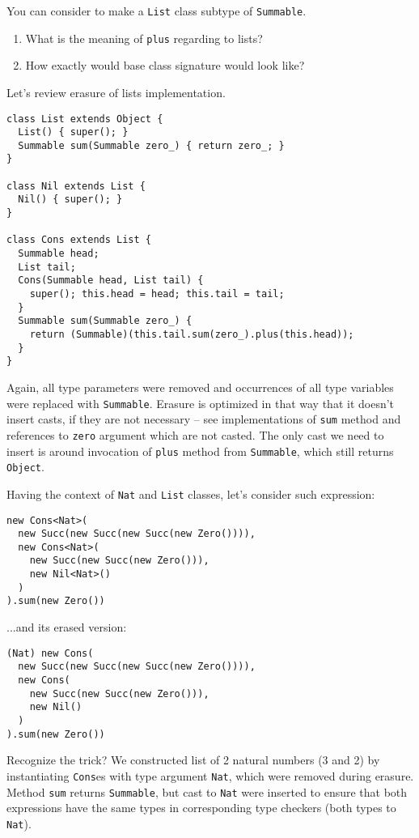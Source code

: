 \documentclass{article}[12pt]
\begin{document}
You can consider to make a \texttt{List} class subtype of
\texttt{Summable}.
\begin{enumerate}
\item What is the meaning of \texttt{plus} regarding to lists?
\item How exactly would base class signature would look like?
\end{enumerate}

Let's review erasure of lists implementation.

\begin{verbatim}
class List extends Object {
  List() { super(); }
  Summable sum(Summable zero_) { return zero_; }
}

class Nil extends List {
  Nil() { super(); }
}

class Cons extends List {
  Summable head;
  List tail;
  Cons(Summable head, List tail) {
    super(); this.head = head; this.tail = tail;
  }
  Summable sum(Summable zero_) {
    return (Summable)(this.tail.sum(zero_).plus(this.head));
  }
}
\end{verbatim}

Again, all type parameters were removed and occurrences of all
type variables were replaced with \texttt{Summable}. Erasure is
optimized in that way that it doesn't insert casts, if they are
not necessary -- see implementations of \texttt{sum} method
and references to \texttt{zero} argument which are not casted.
The only cast we need to insert is around invocation of \texttt{plus}
method from \texttt{Summable}, which still returns \texttt{Object}.

Having the context of \texttt{Nat} and \texttt{List} classes,
let's consider such expression:

\begin{verbatim}
new Cons<Nat>(
  new Succ(new Succ(new Succ(new Zero()))),
  new Cons<Nat>(
    new Succ(new Succ(new Zero())),
    new Nil<Nat>()
  )
).sum(new Zero())
\end{verbatim}
...and its erased version:
\begin{verbatim}
(Nat) new Cons(
  new Succ(new Succ(new Succ(new Zero()))),
  new Cons(
    new Succ(new Succ(new Zero())),
    new Nil()
  )
).sum(new Zero())
\end{verbatim}

Recognize the trick? We constructed list of 2 natural numbers
(3 and 2) by instantiating \texttt{Cons}es with type argument
\texttt{Nat}, which were removed during erasure. Method
\texttt{sum} returns \texttt{Summable}, but cast to
\texttt{Nat} were inserted to ensure that both expressions have
the same types in corresponding type checkers (both types
to \texttt{Nat}).
\end{document}
